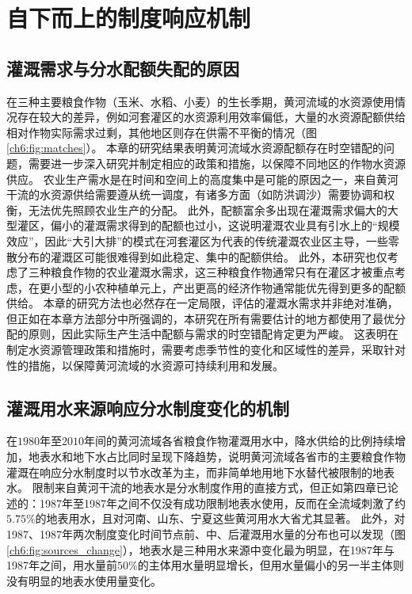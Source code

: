 \section{自下而上的制度响应机制}

\subsection{灌溉需求与分水配额失配的原因}

在三种主要粮食作物（玉米、水稻、小麦）的生长季期，黄河流域的水资源使用情况存在较大的差异，例如河套灌区的水资源利用效率偏低，大量的水资源配额供给相对作物实际需求过剩，其他地区则存在供需不平衡的情况（图\ref{ch6:fig:matches}）。
本章的研究结果表明黄河流域水资源配额存在时空错配的问题，需要进一步深入研究并制定相应的政策和措施，以保障不同地区的作物水资源供应。
农业生产需水是在时间和空间上的高度集中是可能的原因之一，来自黄河干流的水资源供给需要遵从统一调度，有诸多方面（如防洪调沙）需要协调和权衡，无法优先照顾农业生产的分配\cite{hu2015}。
此外，配额富余多出现在灌溉需求偏大的大型灌区，偏小的灌溉需求得到的配额也过小，这说明灌溉农业具有引水上的“规模效应”，因此“大引大排”的模式在河套灌区为代表的传统灌溉农业区主导，一些零散分布的灌溉区可能很难得到如此稳定、集中的配额供给\cite{xiong2021a}。
此外，本研究也仅考虑了三种粮食作物的农业灌溉水需求，这三种粮食作物通常只有在灌区才被重点考虑，在更小型的小农种植单元上，产出更高的经济作物通常能优先得到更多的配额供给。
本章的研究方法也必然存在一定局限，评估的灌溉水需求并非绝对准确，但正如在本章方法部分中所强调的，本研究在所有需要估计的地方都使用了最优分配的原则，因此实际生产生活中配额与需求的时空错配肯定更为严峻。
这表明在制定水资源管理政策和措施时，需要考虑季节性的变化和区域性的差异，采取针对性的措施，以保障黄河流域的水资源可持续利用和发展。


\subsection{灌溉用水来源响应分水制度变化的机制}

在$1980$年至$2010$年间的黄河流域各省粮食作物灌溉用水中，降水供给的比例持续增加，地表水和地下水占比同时呈现下降趋势，说明黄河流域各省市的主要粮食作物灌溉在响应分水制度时以节水改革为主，而非简单地用地下水替代被限制的地表水。
限制来自黄河干流的地表水是分水制度作用的直接方式，但正如第四章已论述的：1987年至1987年之间不仅没有成功限制地表水使用，反而在全流域刺激了约$5.75\%$的地表用水，且对河南、山东、宁夏这些黄河用水大省尤其显著。
此外，对1987、1987年两次制度变化时间节点前、中、后灌溉用水量的分布也可以发现（图\ref{ch6:fig:sources_change}），地表水是三种用水来源中变化最为明显，在1987年与1987年之间，用水量前$50\%$的主体用水量明显增长，但用水量偏小的另一半主体则没有明显的地表水使用量变化。

